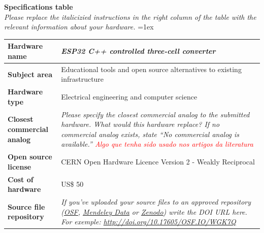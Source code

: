 \documentclass[11pt, letterpaper]{article}
\begin{document}
\begin{flushleft}
  \newpage
  \textbf{Specifications table}\\
  \textit{Please replace the italicizied instructions in the right column of the table with the relevant information about your hardware.}
  \vskip 0.2cm
  \tabulinesep=1ex
  \begin{tabu} to \linewidth {|X|X[3,l]|}
    \hline  \textbf{Hardware name}                                        & \textit{ESP32 C++ controlled three-cell converter}
    \\
    \hline \textbf{Subject area}                                          &                                                    %
    Educational tools and open source alternatives to existing infrastructure
    \\
    \hline \textbf{Hardware type}                                         &
    Electrical engineering and computer science
    \\
    \hline \textbf{Closest commercial analog}                             &
    \textit{Please specify the closest commercial analog to the submitted hardware. What would this hardware replace? If no commercial analog exists, state “No commercial analog is available.” \textcolor{red}{Algo que tenha sido usado nos artigos da literatura}}
    \\
    \hline \textbf{Open source license}                                   &
    CERN Open Hardware Licence Version 2 - Weakly Reciprocal
    \\
    \hline \textbf{Cost of hardware}                                      &
    US\$ 50
    \\
    \hline \textbf{Source file repository}                                &
    \textit{If you’ve uploaded your source files to an approved repository (\href{http://osf.io}{\underline{OSF}}, \href{https://data.mendeley.com/}{\underline{Mendeley Data}} or \href{https://zenodo.org/}{\underline{Zenodo}}) write the DOI URL here. For exemple:  \href{http://doi.org/10.17605/OSF.IO/WGK7Q}{http://doi.org/10.17605/OSF.IO/WGK7Q}}

\end{tabu}
\end{flushleft}
\end{document}
